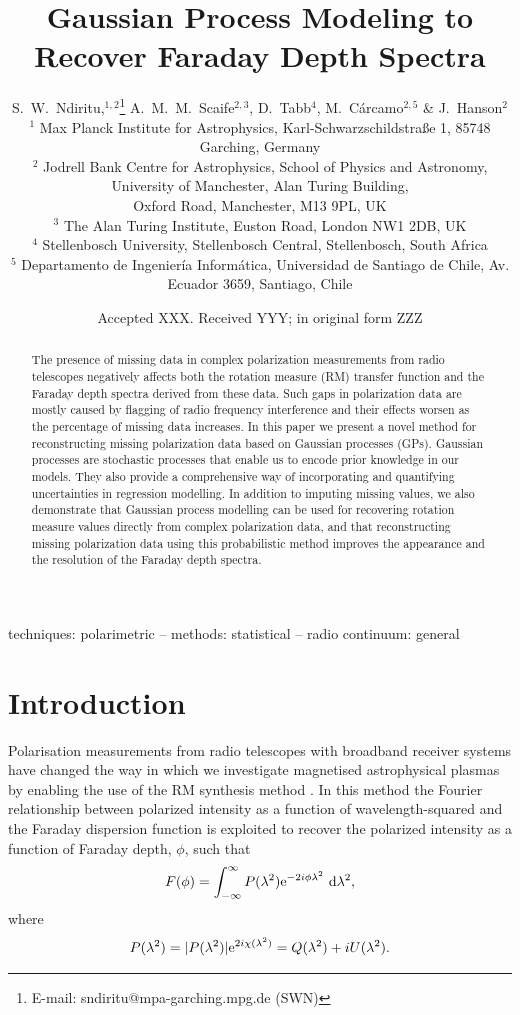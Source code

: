 \documentclass[fleqn,usenatbib]{mnras}
\title[GPM for Faraday Depth Spectra]{Gaussian Process Modeling to Recover Faraday Depth Spectra}
\author[S.~W.~Ndiritu et al.]{
S.~W.~Ndiritu,$^{1,2}$\thanks{E-mail: sndiritu@mpa-garching.mpg.de
 (SWN)}
A.~M.~M.~Scaife$^{2,3}$,
D.~Tabb$^{4}$,
M.~C{\'a}rcamo$^{2,5}$ \&
J.~Hanson$^{2}$ \\
$^{1}$ Max Planck Institute for Astrophysics, Karl-Schwarzschildstra{\ss}e 1, 85748 Garching, Germany \\
$^{2}$ Jodrell Bank Centre for Astrophysics, School of Physics and Astronomy, University of Manchester, Alan Turing Building,\\ Oxford Road, Manchester, M13 9PL, UK \\
$^{3}$ The Alan Turing Institute, Euston Road, London NW1 2DB, UK \\
$^{4}$ Stellenbosch University, Stellenbosch Central, Stellenbosch, South Africa \\
$^{5}$ Departamento de Ingenier\'ia Inform\'atica, Universidad de Santiago de Chile, Av. Ecuador 3659, Santiago, Chile \\
}
\date{Accepted XXX. Received YYY; in original form ZZZ}
\begin{document}
\label{firstpage}
\pagerange{\pageref{firstpage}--\pageref{lastpage}}
\maketitle

\begin{abstract}
The presence of missing data in complex polarization measurements from radio telescopes negatively affects both the rotation measure (RM) transfer function and the Faraday depth spectra derived from these data. Such gaps in polarization data are mostly caused by flagging of radio frequency interference and their effects worsen as the percentage of missing data increases. In this paper we present a novel method for reconstructing missing polarization data based on Gaussian processes (GPs). Gaussian processes are stochastic processes that enable us to encode prior knowledge in our models. They also provide a comprehensive way of incorporating and quantifying uncertainties in regression modelling. In addition to imputing missing values, we also demonstrate that Gaussian process modelling can be used for recovering rotation measure values directly from complex polarization data, and that reconstructing missing polarization data using this probabilistic method improves the appearance and the resolution of the Faraday depth spectra.
\end{abstract}

\begin{keywords}
techniques: polarimetric -- methods: statistical -- radio continuum: general
\end{keywords}



\section{Introduction}

Polarisation measurements from radio telescopes with broadband receiver systems have changed the way in which we investigate magnetised astrophysical plasmas by enabling the use of the RM synthesis method \citep{1966MNRAS.133...67B, 2005A&A...441.1217B}. In this method the Fourier relationship between polarized intensity as a function of wavelength-squared and the Faraday dispersion function is exploited to recover the polarized intensity as a function of Faraday depth, $\phi$, such that
%
\begin{equation}
\label{eq:fourier}
F(\phi) = \int_{-\infty}^{\infty}{ P(\lambda^2){\rm e}^{-2i\phi \lambda^2}~{\rm d}\lambda^2 },
\end{equation}
%
where
%
\begin{equation}
\label{eq:pol}
P(\lambda^2) = |P(\lambda^2)|{\rm e}^{2i\chi(\lambda^2)} = Q(\lambda^2) + iU(\lambda^2).
\end{equation}
\end{document}
